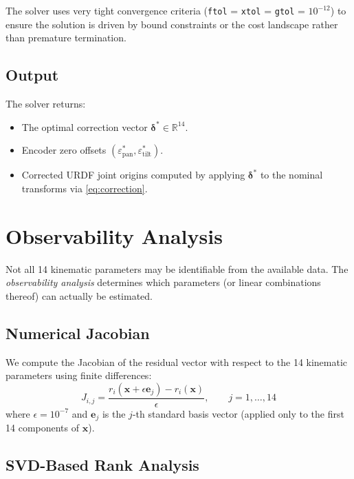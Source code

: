 \documentclass[12pt,a4paper]{article}
\newcommand{\R}{\mathbb{R}}
\newcommand{\code}[1]{\texttt{#1}}
\begin{document}
The solver uses very tight convergence criteria (\code{ftol} = \code{xtol}
= \code{gtol} = $10^{-12}$) to ensure the solution is driven by
bound constraints or the cost landscape rather than premature termination.

\subsection{Output}

The solver returns:
\begin{itemize}[nosep]
    \item The optimal correction vector $\bm{\delta}^* \in \R^{14}$.
    \item Encoder zero offsets $(\varepsilon_{\text{pan}}^*, \varepsilon_{\text{tilt}}^*)$.
    \item Corrected URDF joint origins computed by applying $\bm{\delta}^*$
          to the nominal transforms via \cref{eq:correction}.
\end{itemize}


\section{Observability Analysis}
\label{sec:observability}

Not all 14 kinematic parameters may be identifiable from the available
data. The \emph{observability analysis} determines which parameters (or
linear combinations thereof) can actually be estimated.

\subsection{Numerical Jacobian}

We compute the Jacobian of the residual vector with respect to the
14 kinematic parameters using finite differences:
\begin{equation}
    J_{i,j} = \frac{r_i(\mathbf{x} + \epsilon \mathbf{e}_j) - r_i(\mathbf{x})}
    {\epsilon}, \qquad j = 1, \ldots, 14
    \label{eq:jacobian}
\end{equation}
where $\epsilon = 10^{-7}$ and $\mathbf{e}_j$ is the $j$-th standard basis
vector (applied only to the first 14 components of $\mathbf{x}$).

\subsection{SVD-Based Rank Analysis}
\end{document}
